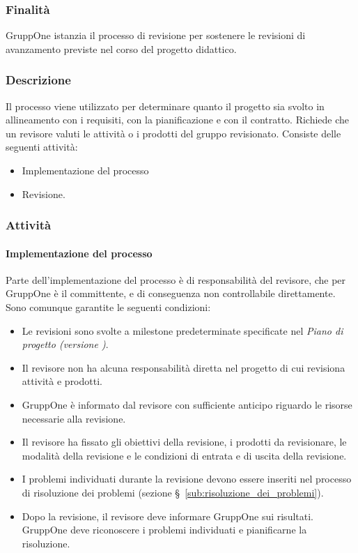 \documentclass[../../norme-di-progetto.tex]{subfiles}
\begin{document}
\subsubsection{Finalità}%
\label{subs:revisione/finalita}

GruppOne istanzia il processo di revisione per sostenere le revisioni di avanzamento previste nel corso del progetto didattico.

\subsubsection{Descrizione}%
\label{subs:revisione/descrizione}

Il processo viene utilizzato per determinare quanto il progetto sia svolto in allineamento con i requisiti, con la pianificazione e con il contratto.
Richiede che un revisore valuti le attività o i prodotti del gruppo revisionato.
Consiste delle seguenti attività:

\begin{itemize}
  \item Implementazione del processo
  \item Revisione.
\end{itemize}

\subsubsection{Attività}%
\label{subs:revisione/attivita}

\paragraph{Implementazione del processo}%
\label{par:revisione/implementazione_del_processo}

Parte dell'implementazione del processo è di responsabilità del revisore, che per GruppOne è il committente, e di conseguenza non controllabile direttamente.
Sono comunque garantite le seguenti condizioni:

\begin{itemize}
  \item Le revisioni sono svolte a milestone predeterminate specificate nel \textit{Piano di progetto (versione \versione)}.
  \item Il revisore non ha alcuna responsabilità diretta nel progetto di cui revisiona attività e prodotti.
  \item GruppOne è informato dal revisore con sufficiente anticipo riguardo le risorse necessarie alla revisione.
  \item Il revisore ha fissato gli obiettivi della revisione, i prodotti da revisionare, le modalità della revisione e le condizioni di entrata e di uscita della revisione.
  \item I problemi individuati durante la revisione devono essere inseriti nel processo di risoluzione dei problemi (sezione §~\ref{sub:risoluzione_dei_problemi}).
  \item Dopo la revisione, il revisore deve informare GruppOne sui risultati. GruppOne deve riconoscere i problemi individuati e pianificarne la risoluzione.
\end{itemize}
\end{document}
